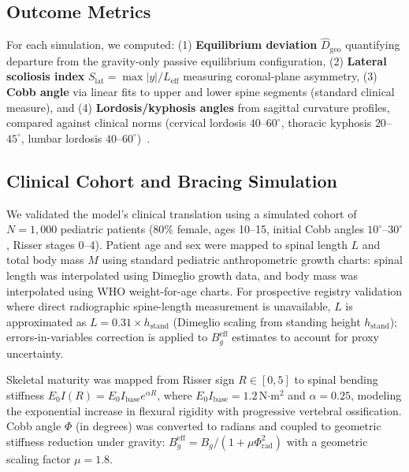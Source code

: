 \subsection{Outcome Metrics}

For each simulation, we computed: (1) \textbf{Equilibrium deviation} $\widehat{D}_{\mathrm{geo}}$ quantifying departure from the gravity-only passive equilibrium configuration, (2) \textbf{Lateral scoliosis index} $S_{\mathrm{lat}} = \max|y|/L_{\mathrm{eff}}$ measuring coronal-plane asymmetry, (3) \textbf{Cobb angle} via linear fits to upper and lower spine segments (standard clinical measure), and (4) \textbf{Lordosis/kyphosis angles} from sagittal curvature profiles, compared against clinical norms (cervical lordosis $40$--$60^{\circ}$, thoracic kyphosis $20$--$45^{\circ}$, lumbar lordosis $40$--$60^{\circ}$)~\cite{white_panjabi_spine}.

\subsection{Clinical Cohort and Bracing Simulation}

We validated the model's clinical translation using a simulated cohort of $N=1,000$ pediatric patients (80\% female, ages 10--15, initial Cobb angles $10^\circ$--$30^\circ$, Risser stages 0--4). Patient age and sex were mapped to spinal length $L$ and total body mass $M$ using standard pediatric anthropometric growth charts: spinal length was interpolated using Dimeglio growth data, and body mass was interpolated using WHO weight-for-age charts. For prospective registry validation where direct radiographic spine-length measurement is unavailable, $L$ is approximated as $L = 0.31 \times h_{\mathrm{stand}}$ (Dimeglio scaling from standing height $h_{\mathrm{stand}}$); errors-in-variables correction is applied to $B_g^{\mathrm{eff}}$ estimates to account for proxy uncertainty.

Skeletal maturity was mapped from Risser sign $R \in [0, 5]$ to spinal bending stiffness $E_0 I(R) = E_0 I_{\mathrm{base}} e^{\alpha R}$, where $E_0 I_{\mathrm{base}} = 1.2$\,N$\cdot$m$^2$ and $\alpha = 0.25$, modeling the exponential increase in flexural rigidity with progressive vertebral ossification. Cobb angle $\Phi$ (in degrees) was converted to radians and coupled to geometric stiffness reduction under gravity: $B_g^{\mathrm{eff}} = B_g / (1 + \mu \Phi_{\mathrm{rad}}^2)$ with a geometric scaling factor $\mu = 1.8$.

